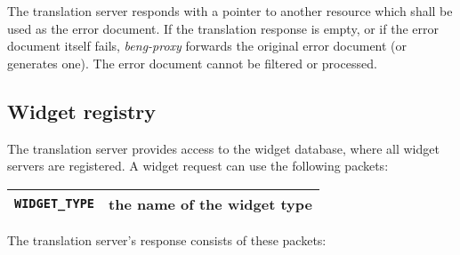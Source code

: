 \documentclass[a4paper,12pt]{article}
\begin{document}
The translation server responds with a pointer to another resource
which shall be used as the error document.  If the translation
response is empty, or if the error document itself fails,
\emph{beng-proxy} forwards the original error document (or generates
one).  The error document cannot be filtered or processed.

\subsection{Widget registry}
\label{registry}

The translation server provides access to the widget database, where
all widget servers are registered.  A widget request can use the
following packets:

\begin{longtable}{|l|p{10cm}|}
\hline
\verb|WIDGET_TYPE| & the name of the widget type \\
\hline
\end{longtable}

The translation server's response consists of these packets:
\end{document}
